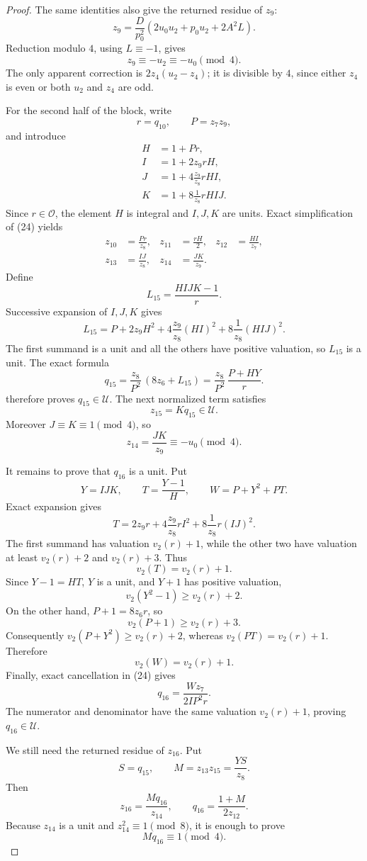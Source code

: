 \documentclass[11pt]{article}
\theoremstyle{remark}
\newcommand{\Ot}{\mathcal O}
\newcommand{\Ut}{\mathcal U}
\newcommand{\vt}{v_2}
\begin{document}
\begin{proof}
The same identities also give the returned residue of \(z_9\):
\[
 z_9=\frac{D}{p_0^2}
 \left(2u_0u_2+p_0u_2+2A^2L\right).
\]
Reduction modulo \(4\), using \(L\equiv-1\), gives
\[
 z_9\equiv-u_2\equiv-u_0\pmod4.
\]
The only apparent correction is \(2z_4(u_2-z_4)\); it is divisible by
\(4\), since either \(z_4\) is even or both \(u_2\) and \(z_4\) are odd.

For the second half of the block, write
\[
 r=q_{10},\qquad P=z_7z_9,
\]
and introduce
\[
\begin{aligned}
H&=1+Pr,\\
I&=1+2z_9rH,\\
J&=1+4\frac{z_9}{z_8}rHI,\\
K&=1+8\frac1{z_8}rHIJ.
\end{aligned}
\]
Since \(r\in\Ot\), the element \(H\) is integral and \(I,J,K\) are
units.  Exact simplification of (24) yields
\[
\begin{aligned}
z_{10}&=\frac{Pr}{z_8},&
z_{11}&=\frac{rH}{2},&
z_{12}&=\frac{HI}{z_7},\\
z_{13}&=\frac{IJ}{z_8},&
z_{14}&=\frac{JK}{z_9}.
\end{aligned}
\]
Define
\[
 L_{15}=\frac{HIJK-1}{r}.
\]
Successive expansion of \(I,J,K\) gives
\[
 L_{15}=P+2z_9H^2
 +4\frac{z_9}{z_8}(HI)^2
 +8\frac1{z_8}(HIJ)^2.
\]
The first summand is a unit and all the others have positive valuation,
so \(L_{15}\) is a unit.  The exact formula
\[
 q_{15}=\frac{z_8}{P^2}\,(8z_6+L_{15})
       =\frac{z_8}{P^2}\,\frac{P+HY}{r}.
\]
therefore proves \(q_{15}\in\Ut\).  The next normalized term satisfies
\[
 z_{15}=Kq_{15}\in\Ut.
\]
Moreover \(J\equiv K\equiv1\pmod4\), so
\[
 z_{14}=\frac{JK}{z_9}\equiv-u_0\pmod4.
\]

It remains to prove that \(q_{16}\) is a unit.  Put
\[
 Y=IJK,\qquad
 T=\frac{Y-1}{H},\qquad
 W=P+Y^2+PT.
\]
Exact expansion gives
\[
 T=2z_9r
 +4\frac{z_9}{z_8}rI^2
 +8\frac1{z_8}r(IJ)^2.
\]
The first summand has valuation \(\vt(r)+1\), while the other two have
valuation at least \(\vt(r)+2\) and \(\vt(r)+3\).  Thus
\[
 \vt(T)=\vt(r)+1.
\]
Since \(Y-1=HT\), \(Y\) is a unit, and \(Y+1\) has positive valuation,
\[
 \vt(Y^2-1)\geq\vt(r)+2.
\]
On the other hand, \(P+1=8z_6r\), so
\[
 \vt(P+1)\geq\vt(r)+3.
\]
Consequently \(\vt(P+Y^2)\geq\vt(r)+2\), whereas
\(\vt(PT)=\vt(r)+1\).  Therefore
\[
 \vt(W)=\vt(r)+1.
\]
Finally, exact cancellation in (24) gives
\[
 q_{16}=\frac{Wz_7}{2IP^2r}.
\]
The numerator and denominator have the same valuation
\(\vt(r)+1\), proving \(q_{16}\in\Ut\).

We still need the returned residue of \(z_{16}\).  Put
\[
 S=q_{15},\qquad M=z_{13}z_{15}=\frac{YS}{z_8}.
\]
Then
\[
 z_{16}=\frac{Mq_{16}}{z_{14}},
 \qquad q_{16}=\frac{1+M}{2z_{12}}.
\]
Because \(z_{14}\) is a unit and \(z_{14}^2\equiv1\pmod8\), it is enough
to prove
\[
 Mq_{16}\equiv1\pmod4.                                         \tag{29}
\]


\end{proof}
\end{document}
